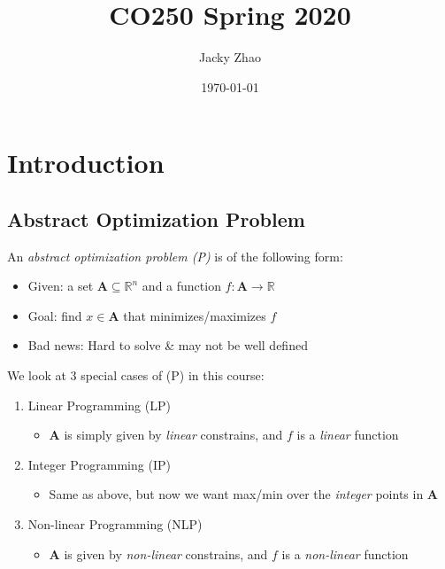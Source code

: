 \documentclass[letterpaper, 12pt]{article}
\begin{document}
    
    \clearpage
    \vspace*{\fill}
    \begin{center}
        \begin{minipage}{\textwidth} 
            \title{CO250 Spring 2020}
            \author{Jacky Zhao}
            \date{\today}
            \maketitle
        \end{minipage} 
    \end{center}
    \vfill
    \thispagestyle{empty}
    \newpage
    \setcounter{page}{1}

    \section{Introduction}
    \subsection{Abstract Optimization Problem}
    An \textit{abstract optimization problem (P)} is of the following form:
    \begin{itemize}
        \item {\color{red}Given}: a set $\textbf{A} \subseteq \mathbb{R}^n$ and a function $f:\textbf{A} \rightarrow \mathbb{R}$
        \item {\color{red}Goal}: find $x \in \textbf{A}$ that minimizes/maximizes $f$
        \item {\color{red}Bad news}: Hard to solve \& may not be well defined
    \end{itemize}
    
    \bigskip
    We look at 3 special cases of (P) in this course:
    \begin{enumerate}
        \item {\color{red}Linear Programming (LP)}
        \begin{itemize}
            \item $\textbf{A}$ is simply given by \textit{linear} constrains, and $f$ is a \textit{linear} function
        \end{itemize}
        \item {\color{red}Integer Programming (IP)}
        \begin{itemize}
            \item Same as above, but now we want max/min over the \textit{integer} points in $\textbf{A}$
        \end{itemize}
        \item {\color{red}Non-linear Programming (NLP)}
        \begin{itemize}
            \item $\textbf{A}$ is given by \textit{non-linear} constrains, and $f$ is a \textit{non-linear} function
        \end{itemize}
    \end{enumerate}
    
\end{document}
